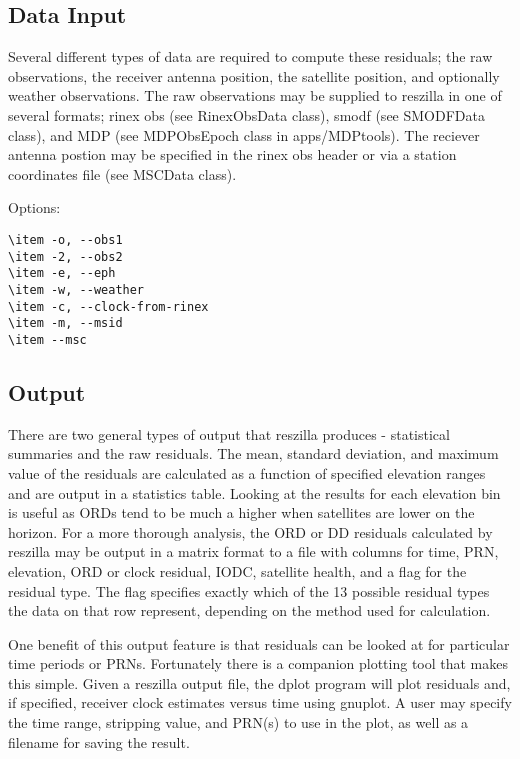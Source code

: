 \subsection{Data Input}

Several different types of data are required to compute these
residuals; the raw observations, the receiver antenna position, the
satellite position, and optionally  weather observations. The raw
observations may be supplied to reszilla in one of several formats;
rinex obs (see RinexObsData class), smodf (see SMODFData class), and
MDP (see MDPObsEpoch class in apps/MDPtools). The reciever antenna
postion may be specified in the rinex obs header or via a station
coordinates file (see MSCData class).

Options:

\begin{verbatim}
\item -o, --obs1
\item -2, --obs2
\item -e, --eph
\item -w, --weather
\item -c, --clock-from-rinex
\item -m, --msid
\item --msc
\end{verbatim}

\subsection{Output}
There are two general types of output that reszilla produces -
statistical summaries and the raw residuals.  The mean, standard 
deviation, and maximum value of the residuals are calculated 
as a function of specified elevation ranges and are output in a 
statistics table. Looking at the results for each elevation bin 
is useful as ORDs tend to be much a higher when satellites are 
lower on the horizon. For a more thorough analysis, the ORD or DD 
residuals calculated by reszilla may be output in a matrix format 
to a file with columns for time, PRN, elevation, ORD or clock residual, 
IODC, satellite health, and a flag for the residual type.  The flag 
specifies exactly which of the 13 possible residual types the data 
on that row represent, depending on the method used for calculation. 

One benefit of this output feature is that residuals can be looked at 
for particular time periods or PRNs. Fortunately there is a companion 
plotting tool that makes this simple. Given a reszilla output file, 
the dplot program will plot residuals and, if specified, receiver clock 
estimates versus time using gnuplot. A user may specify the time 
range, stripping value, and PRN(s) to use in the plot, as well as a
filename for saving the result. 

